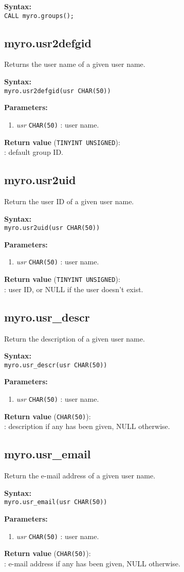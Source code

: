 \documentclass[12pt,titlepage]{article}
\newcommand{\syntax}[1]
{
  \bigskip
  \noindent
  \textbf{Syntax: } \\ 
  \indent \texttt{#1}
}
\newenvironment{parameters}
{
  \bigskip
  \noindent
  \textbf{Parameters:}
  \begin{enumerate}
}
{
  \end{enumerate}
}
\newcommand{\param}[2]
{
  \item \textit{#1} \texttt{#2} 
}
\newcommand{\return}[1]
{
  \bigskip
  \noindent
  \textbf{Return value} (\texttt{#1}): \\
  \indent
}
\begin{document}
\syntax{CALL myro.groups();}






\subsection{myro.usr2defgid}
Returns the user name of a given user name.

\syntax{myro.usr2defgid(usr CHAR(50))}

\begin{parameters}
\param{usr}{CHAR(50)}: user name.
\end{parameters}

\return{TINYINT UNSIGNED}: default group ID.

%
\subsection{myro.usr2uid}
Return the user ID of a given user name.

\syntax{myro.usr2uid(usr CHAR(50))}

\begin{parameters}
\param{usr}{CHAR(50)}: user name.
\end{parameters}

\return{TINYINT UNSIGNED}: user ID, or NULL if the user doesn't
exist.



\subsection{myro.usr\_descr}
Return the description of a given user name.

\syntax{myro.usr\_descr(usr CHAR(50))}

\begin{parameters}
\param{usr}{CHAR(50)}: user name.
\end{parameters}

\return{CHAR(50)}: description if any has been given, NULL otherwise.

%
\subsection{myro.usr\_email}
Return the e-mail address of a given user name.

\syntax{myro.usr\_email(usr CHAR(50))}

\begin{parameters}
\param{usr}{CHAR(50)}: user name.
\end{parameters}

\return{CHAR(50)}: e-mail address if any has been given, NULL
otherwise.
\end{document}
